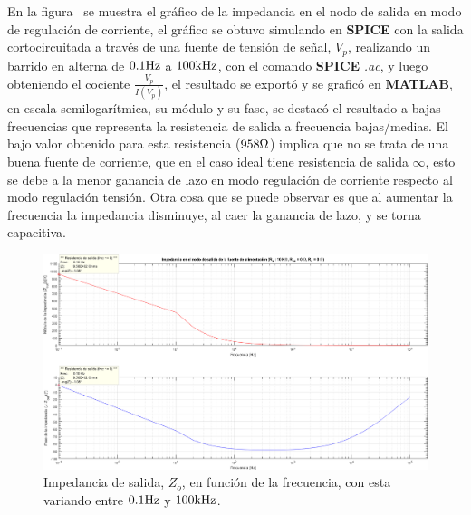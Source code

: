 
\vspace{1.5cm}


En la figura~ se muestra el gráfico de la impedancia en el nodo de salida en modo de regulación de corriente, el gráfico se obtuvo simulando en \textbf{SPICE} con la salida cortocircuitada a través de una fuente de tensión de señal, $V_{p}$, realizando un barrido en alterna de $0.1 \si[per-mode=symbol]{\hertz}$ a $100 \si[per-mode=symbol]{\kilo\hertz}$, con el comando \textbf{SPICE} \textit{.ac}, y luego obteniendo el cociente $\frac{V_{p}}{I\left({V_{p}}\right)}$, el resultado se exportó y se graficó en \textbf{MATLAB}, en escala semilogarítmica, su módulo y su fase, se destacó el resultado a bajas frecuencias que representa la resistencia de salida a frecuencia bajas/medias. El bajo valor obtenido para esta resistencia ($958 \si[per-mode=symbol]{\ohm}$) implica que no se trata de una buena fuente de corriente, que en el caso ideal tiene resistencia de salida $\infty$, esto se debe a la menor ganancia de lazo en modo regulación de corriente respecto al modo regulación tensión. Otra cosa que se puede observar es que al aumentar la frecuencia la impedancia disminuye, al caer la ganancia de lazo, y se torna capacitiva.




\vfill

\clearpage

\begin{figure}[H] %
\begin{center}
\includegraphics[width=1.2 \textwidth, angle=90]{./img/preguntas/p14.png}
\caption{\label{fig:fig_p14_output_impedance}\footnotesize{Impedancia de salida, $Z_{o}$, en función de la frecuencia, con esta variando entre $0.1 \si[per-mode=symbol]{\hertz}$ y $100 \si[per-mode=symbol]{\kilo\hertz}$.}}
\end{center}
\end{figure}



\clearpage
